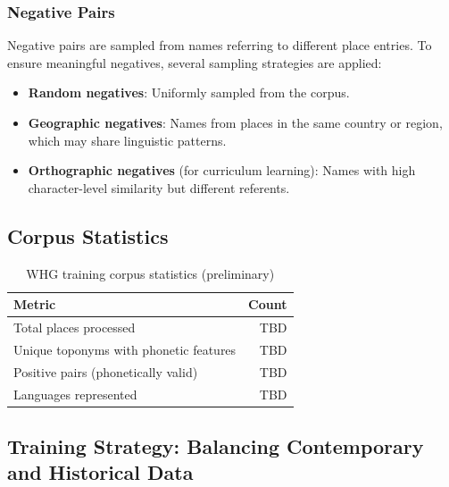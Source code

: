 \documentclass[11pt]{article}
\begin{document}
    \subsubsection{Negative Pairs}

    Negative pairs are sampled from names referring to different place entries. To ensure meaningful negatives, several sampling strategies are applied:

    \begin{itemize}
        \item \textbf{Random negatives}: Uniformly sampled from the corpus.
        \item \textbf{Geographic negatives}: Names from places in the same country or region, which may share linguistic patterns.
        \item \textbf{Orthographic negatives} (for curriculum learning): Names with high character-level similarity but different referents.
    \end{itemize}

    \subsection{Corpus Statistics}

    \begin{table}[h]
        \caption{WHG training corpus statistics (preliminary)}
        \label{tab:corpus-stats}
        \begin{tabular}{lr}
            \toprule
            \textbf{Metric}                        & \textbf{Count} \\
            \midrule
            Total places processed                 & TBD            \\
            Unique toponyms with phonetic features & TBD            \\
            Positive pairs (phonetically valid)    & TBD            \\
            Languages represented                  & TBD            \\
            \bottomrule
        \end{tabular}
    \end{table}

    \subsection{Training Strategy: Balancing Contemporary and Historical Data}
\end{document}
